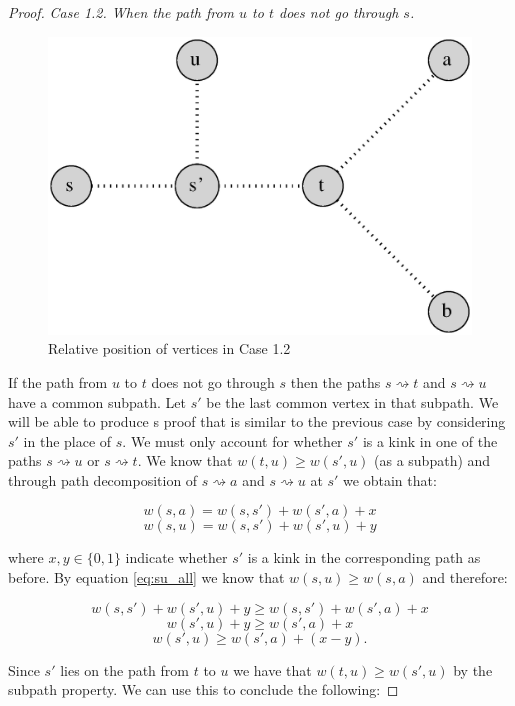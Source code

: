 \begin{proof}

{\em Case 1.2. When the path from $u$ to $t$ does not go through $s$.}

\begin{figure}%
    \centering
    \includegraphics[center, scale=0.5 ]{./images/2xbfs-case-1-2.eps}
    \caption{Relative position of vertices in Case 1.2 }%
    \label{fig:case1.2}%
\end{figure}

If the path from $u$ to $t$ does not go through $s$ then the paths $s \rightsquigarrow t$ and $s \rightsquigarrow u$ have a common subpath. Let $s'$ be the last common vertex in that subpath. We will be able to produce s proof that is similar to the previous case by considering $s'$ in the place of $s$. We must only account for whether $s'$ is a kink in one of the paths $s \rightsquigarrow u$ or $s \rightsquigarrow t$. We know that $w(t, u) \ge w(s', u)$ (as a subpath) and through path decomposition of  $s \rightsquigarrow a$ and $s \rightsquigarrow u$ at $s'$ we obtain that:

$$ w(s, a) = w(s, s') + w(s', a) + x $$
$$ w(s, u) = w(s, s') + w(s', u) + y $$

where $x,y \in \{0, 1\}$ indicate whether $s'$ is a kink in the corresponding path as before. By equation \ref{eq:su_all} we know that $w(s, u) \ge w(s, a)$ and therefore:

$$ w(s, s') + w(s', u) + y \ge w(s, s') + w(s', a) + x  $$
$$ w(s', u) + y \ge w(s', a) + x $$
$$ w(s', u) \ge w(s', a) + (x - y).$$

Since $s'$ lies on the path from $t$ to $u$ we have that $w(t, u) \ge w(s', u)$ by the subpath property. We can use this to conclude the following:


\end{proof}
